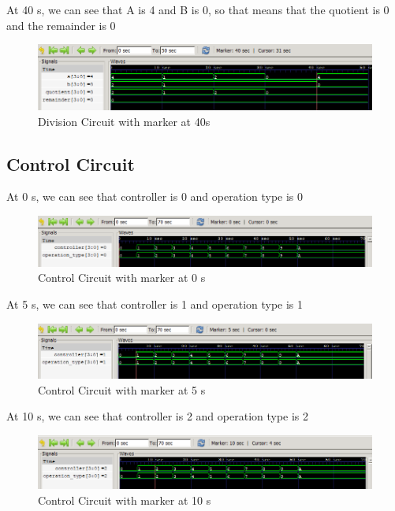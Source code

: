 \documentclass[12pt]{article}
\begin{document}
At 40 s, we can see that A is 4 and B is 0, so that means that the quotient is 0 and the remainder is 0
\begin{figure}[h]
    \centering
    \includegraphics[width = 1.0\textwidth]{figs/Div40.png}
    \caption{Division Circuit with marker at 40s}
    \label{fig:enter-label}
\end{figure}







\newpage

\subsection{Control Circuit}

At 0 s, we can see that controller is 0 and operation type is 0
\begin{figure}[h]
    \centering
    \includegraphics[width = 1.0\textwidth]{figs/CCirc0.png}
    \caption{Control Circuit with marker at 0 s}
    \label{fig:enter-label}
\end{figure}

At 5 s, we can see that controller is 1 and operation type is 1
\begin{figure}[h]
    \centering
    \includegraphics[width = 1.0\textwidth]{figs/CCirc5.png}
    \caption{Control Circuit with marker at 5 s}
    \label{fig:enter-label}
\end{figure}

At 10 s, we can see that controller is 2 and operation type is 2
\begin{figure}[h]
    \centering
    \includegraphics[width = 1.0\textwidth]{figs/CCirc10.png}
    \caption{Control Circuit with marker at 10 s}
    \label{fig:enter-label}
\end{figure}
\end{document}
